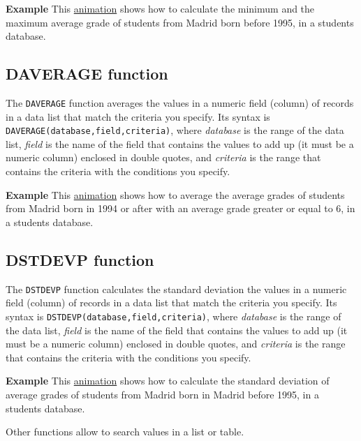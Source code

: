 \textbf{Example} This \href{http://aprendeconalf.es/office/excel/manual/img/example_function_dmin_dmax.gif}{animation} shows how to calculate the minimum and the maximum average grade of students from Madrid born before 1995, in a students database.

\subsection{DAVERAGE function}\hypertarget{daverage-function}{}\label{daverage-function}

The \texttt{DAVERAGE} function averages the values in a numeric field (column) of records in a data list that match the criteria you specify. Its syntax is \texttt{DAVERAGE(database,field,criteria)}, where \emph{database} is the range of the data list, \emph{field} is the name of the field that contains the values to add up (it must be a numeric column) enclosed in double quotes, and \emph{criteria} is the range that contains the criteria with the conditions you specify.

\textbf{Example} This \href{http://aprendeconalf.es/office/excel/manual/img/example_function_daverage.gif}{animation} shows how to average the average grades of students from Madrid born in 1994 or after with an average grade greater or equal to 6, in a students database.

\subsection{DSTDEVP function}\hypertarget{dstdevp-function}{}\label{dstdevp-function}

The \texttt{DSTDEVP} function calculates the standard deviation the values in a numeric field (column) of records in a data list that match the criteria you specify. Its syntax is \texttt{DSTDEVP(database,field,criteria)}, where \emph{database} is the range of the data list, \emph{field} is the name of the field that contains the values to add up (it must be a numeric column) enclosed in double quotes, and \emph{criteria} is the range that contains the criteria with the conditions you specify.

\textbf{Example} This \href{http://aprendeconalf.es/office/excel/manual/img/example_function_dstdevp.gif}{animation} shows how to calculate the standard deviation of average grades of students from Madrid born in Madrid before 1995, in a students database.

Other functions allow to search values in a list or table.

